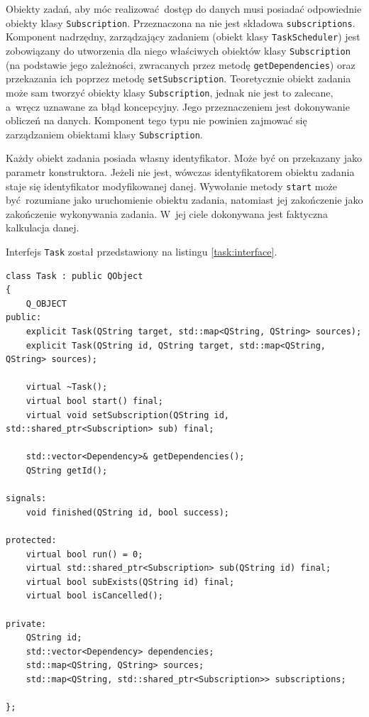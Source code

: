 Obiekty zadań, aby móc realizować dostęp do danych musi posiadać odpowiednie obiekty klasy \lstinline$Subscription$. Przeznaczona na nie jest składowa \lstinline$subscriptions$. Komponent nadrzędny, zarządzający zadaniem (obiekt klasy \lstinline$TaskScheduler$) jest zobowiązany do utworzenia dla niego właściwych obiektów klasy \lstinline$Subscription$ (na podstawie jego zależności, zwracanych przez metodę \lstinline$getDependencies$) oraz przekazania ich poprzez metodę \lstinline$setSubscription$. Teoretycznie obiekt zadania może sam tworzyć obiekty klasy \lstinline$Subscription$, jednak nie jest to zalecane, a~wręcz uznawane za błąd koncepcyjny. Jego przeznaczeniem jest dokonywanie obliczeń na danych. Komponent tego typu nie powinien zajmować się zarządzaniem obiektami klasy \lstinline$Subscription$.

Każdy obiekt zadania posiada własny identyfikator. Może być on przekazany jako parametr konstruktora. Jeżeli nie jest, wówczas identyfikatorem obiektu zadania staje się identyfikator modyfikowanej danej. Wywołanie metody \lstinline$start$ może być rozumiane jako uruchomienie obiektu zadania, natomiast jej zakończenie jako zakończenie wykonywania zadania. W~jej ciele dokonywana jest faktyczna kalkulacja danej.

Interfejs \lstinline$Task$ został przedstawiony na listingu \ref{task:interface}. 

\begin{minipage}{\textwidth}
	\begin{lstlisting}[label=task:interface, caption={Interfejs klasy \lstinline$Task$},alsoletter={()[].=}]
class Task : public QObject
{
	Q_OBJECT
public:
	explicit Task(QString target, std::map<QString, QString> sources);
	explicit Task(QString id, QString target, std::map<QString, QString> sources);

	virtual ~Task();
	virtual bool start() final;
	virtual void setSubscription(QString id, std::shared_ptr<Subscription> sub) final;

	std::vector<Dependency>& getDependencies();
	QString getId();

signals:
	void finished(QString id, bool success);

protected:
	virtual bool run() = 0;
	virtual std::shared_ptr<Subscription> sub(QString id) final;
	virtual bool subExists(QString id) final;
	virtual bool isCancelled();

private:
	QString id;
	std::vector<Dependency> dependencies;
	std::map<QString, QString> sources;
	std::map<QString, std::shared_ptr<Subscription>> subscriptions;

};
	\end{lstlisting}
\end{minipage}

